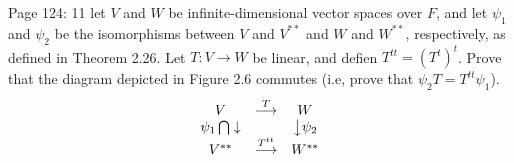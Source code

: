 \documentclass[10pt,a4paper]{report}
\begin{document}
\noindent Page 124: 11 let $V$ and $W$ be infinite-dimensional vector spaces over $F$, and let $\psi_1$ and $\psi_2$ be the isomorphisms between $V$ and $V^{**}$ and $W$ and $W^{**}$, respectively, as defined in Theorem 2.26.  Let $T: V \to W$ be linear, and defien $T^{tt}=(T^t)^t$.  Prove that the diagram depicted in Figure 2.6 commutes (i.e, prove that $\psi_2 T = T^{tt}\psi_1$).
\begin{align*}
	\begin{array}{ccc}
		V & \overset{T} \longrightarrow & W \\
		\psi_1 \bigcap\downarrow & & \big\downarrow \psi_2 \\
		V^{**} & \overset{T^{tt}} \longrightarrow  & W^{**}
	\end{array}
\end{align*}
\end{document}
